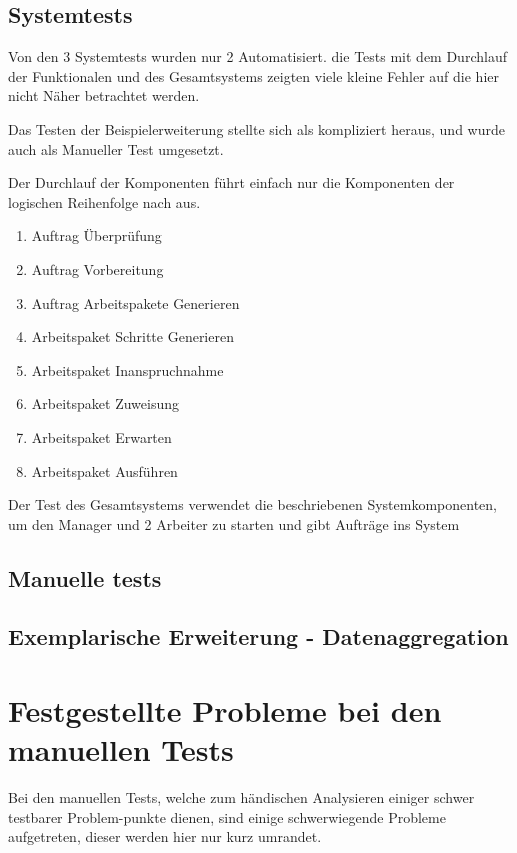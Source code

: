 \subsection{Systemtests}

Von den 3 Systemtests wurden nur 2 Automatisiert.
die Tests mit dem Durchlauf der Funktionalen  und des Gesamtsystems
zeigten viele kleine Fehler auf die hier nicht Näher betrachtet werden.

Das Testen der Beispielerweiterung stellte sich als kompliziert heraus, und wurde auch als Manueller Test umgesetzt.

Der Durchlauf der Komponenten führt einfach nur die Komponenten der logischen Reihenfolge nach aus.
\begin{enumerate}
    \item Auftrag Überprüfung
    \item Auftrag Vorbereitung
    \item Auftrag Arbeitspakete Generieren
    \item Arbeitspaket Schritte Generieren
    \item Arbeitspaket Inanspruchnahme
    \item Arbeitspaket Zuweisung
    \item Arbeitspaket Erwarten
    \item Arbeitspaket Ausführen
\end{enumerate}

Der Test des Gesamtsystems verwendet die beschriebenen Systemkomponenten, um den Manager und 2 Arbeiter zu starten und gibt Aufträge ins System

\subsection{Manuelle tests}

\subsection{Exemplarische Erweiterung - Datenaggregation}



\section{Festgestellte Probleme bei den manuellen Tests}

Bei den manuellen Tests, welche zum händischen Analysieren
einiger schwer testbarer Problem-punkte dienen,
sind einige schwerwiegende Probleme aufgetreten,
dieser werden hier nur kurz umrandet.

